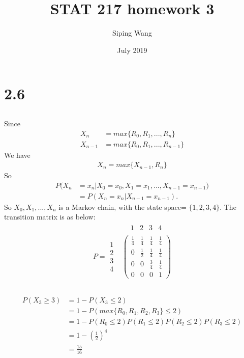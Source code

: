 \documentclass{article}
\title{STAT 217 homework 3}
\author{Siping Wang}
\date{July 2019}
\begin{document}
\maketitle

\section{2.6}
\subsection{}
Since
\begin{align*}
    X_n&=max\{R_0, R_1, ..., R_n\}\\
    X_{n-1}&=max\{R_0, R_1, ..., R_{n-1}\}
\end{align*}
We have
\begin{align*}
    X_n = max\{X_{n-1}, R_n\}
\end{align*}
So
\begin{align*}
    P(X_n&=x_n|X_0=x_0, X_1=x_1,...,X_{n-1}=x_{n-1}) \\
    &= P(X_n=x_n|X_{n-1}=x_{n-1}).
\end{align*}
So $X_0, X_1, ...,X_n$ is a Markov chain, with the state space= $\{1, 2, 3, 4\}$.
The transition matrix is as below:
\begin{align*}
    &\begin{matrix}
    &1&2&3&4
    \end{matrix}\\
    P=
    \begin{matrix}
    1 \\ 2 \\ 3 \\ 4
    \end{matrix}
    &\begin{pmatrix}
    \frac{1}{4}&\frac{1}{4}&\frac{1}{4}&\frac{1}{4} \\
    0&\frac{1}{2}&\frac{1}{4}&\frac{1}{4} \\
    0&0&\frac{3}{4}&\frac{1}{4}\\
    0&0&0&1
    \end{pmatrix}
\end{align*}
\subsection{}
\begin{align*}
    P(X_3 \ge 3) &= 1 - P(X_3 \le 2) \\
    &= 1-P(max\{R_0, R_1, R_2, R_3\} \le 2) \\
    &= 1-P(R_0 \le 2)P(R_1 \le 2)P(R_2 \le 2)P(R_3 \le 2) \\
    &= 1-(\frac{1}{2})^4 \\
    &= \frac{15}{16}
\end{align*}
\end{document}
